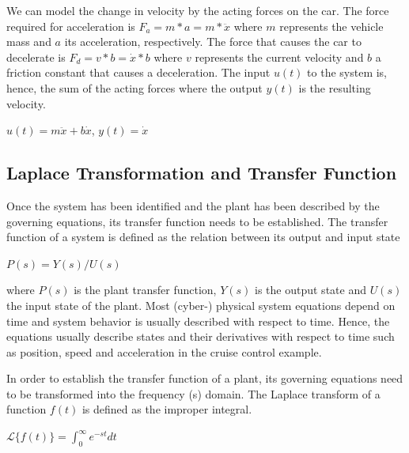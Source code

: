 \documentclass[paper=letter, fontsize=11pt]{scrartcl}
\numberwithin{equation}{section}
\numberwithin{figure}{section}
\numberwithin{table}{section}
\begin{document}
\par
We can model the change in velocity by the acting forces on the car.
The force required for acceleration is $F_{a} = m * a = m * \ddot{x}$
where $m$ represents the vehicle mass and $a$ its acceleration,
respectively. The force that causes the car to decelerate is
$F_{d} = v * b = \dot{x} * b$ where $v$ represents the current velocity
and $b$ a friction constant that causes a deceleration. The input $u(t)$
to the system is, hence, the sum of the acting forces where the output $y(t)$
is the resulting velocity.

\begin{center}
\begin{framed}
$u(t) = m\ddot{x} + b\dot{x}$, $y(t) = \dot{x}$
\end{framed} 
\end{center}

\subsection{Laplace Transformation and Transfer Function}
\label{sec:laplace_transformation_transfer_function}
\par
Once the system has been identified and the plant has been described by the
governing equations, its transfer function needs to be established. The transfer
function of a system is defined as the relation between its output and input
state

\begin{framed}
\begin{center}
$P(s) = Y(s) / U(s)$
\end{center}
\end{framed} 

where $P(s)$ is the plant transfer function, $Y(s)$ is the output state and
$U(s)$ the input state of the plant. Most (cyber-) physical system equations
depend on time and system behavior is usually described with respect to time.
Hence, the equations usually describe states and their derivatives with respect
to time such as position, speed and acceleration in the cruise control example.

\par
In order to establish the transfer function of a plant, its governing equations
need to be transformed into the frequency (s) domain. The Laplace transform
of a function $f(t)$ is defined as the improper integral.

\begin{framed}
\begin{center}
$\mathcal{L}\{f(t)\} = \int_{0}^{\infty} e^{-st} dt$
\end{center}
\end{framed}
\end{document}

